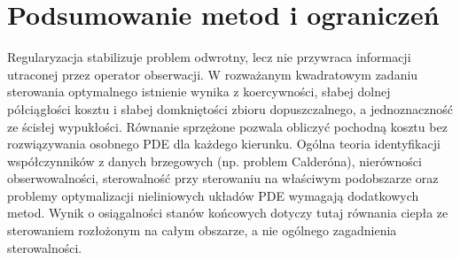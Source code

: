 \section{Podsumowanie metod i ograniczeń}
Regularyzacja stabilizuje problem odwrotny, lecz nie przywraca
informacji utraconej przez operator obserwacji.
W rozważanym kwadratowym zadaniu sterowania optymalnego
istnienie wynika z koercywności, słabej dolnej
półciągłości kosztu i słabej domkniętości zbioru
dopuszczalnego, a jednoznaczność ze ścisłej wypukłości.
Równanie sprzężone pozwala obliczyć pochodną
kosztu bez rozwiązywania osobnego PDE dla każdego kierunku.
Ogólna teoria identyfikacji współczynników z danych brzegowych
(np. problem Calderóna), nierówności obserwowalności,
sterowalność przy sterowaniu na właściwym podobszarze
oraz problemy optymalizacji nieliniowych układów PDE
wymagają dodatkowych metod. Wynik o osiągalności
stanów końcowych dotyczy tutaj równania ciepła
ze sterowaniem rozłożonym na całym obszarze,
a nie ogólnego zagadnienia sterowalności.


\appendix

